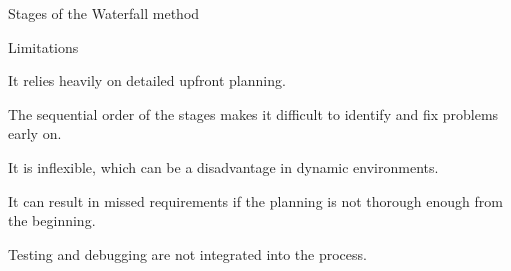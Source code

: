 \begin{frame}{Stages of the Waterfall method}
    \begin{alertblock}{Limitations}
        \item It relies heavily on detailed upfront planning.
               
        \item The sequential order of the stages makes it difficult to identify and fix problems early on.
        
        \item It is inflexible, which can be a disadvantage in dynamic environments.
        \
        \item It can result in missed requirements if the planning is not thorough enough from the beginning.
        
        \item Testing and debugging are not integrated into the process.
        
    \end{alertblock}
    \end{frame}